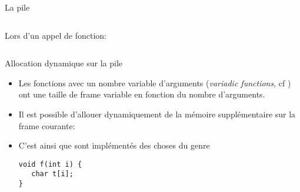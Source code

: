 \begin{frame}{La pile}
  \begin{columns}
    \begin{column}{6cm}
      Lors d'un appel de fonction:
      \begin{itemize}
      \end{itemize}
    \end{column}
    \begin{column}{6.5cm}
      \begin{overprint}
      \end{overprint}
    \end{column}
  \end{columns}
\end{frame}



\begin{frame}[fragile=singleslide]{Allocation dynamique sur la pile}
  \begin{itemize}
  \item   Les   fonctions   avec   un  nombre   variable   d'arguments
    (\emph{variadic functions}, cf  ) ont une taille de
    frame variable en fonction du nombre d'arguments.
  \item  Il  est  possible   d'allouer  dynamiquement  de  la  mémoire
    supplémentaire sur la frame courante: 
  \item C'est ainsi que sont implémentés des choses du genre
    \begin{lstlisting}
void f(int i) {
   char t[i];
}
    \end{lstlisting}
  \end{itemize}
\end{frame}

